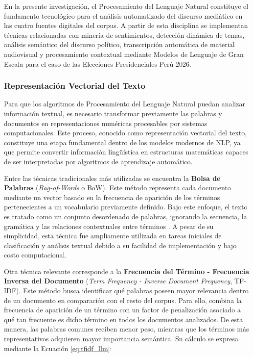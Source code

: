 En la presente investigación, el Procesamiento del Lenguaje Natural constituye el fundamento tecnológico para el análisis automatizado del discurso mediático en las cuatro fuentes digitales del corpus. A partir de esta disciplina se implementan técnicas relacionadas con minería de sentimientos, detección dinámica de temas, análisis semántico del discurso político, transcripción automática de material audiovisual y procesamiento contextual mediante Modelos de Lenguaje de Gran Escala para el caso de las Elecciones Presidenciales Perú 2026.

\subsubsection{Representación Vectorial del Texto}

Para que los algoritmos de Procesamiento del Lenguaje Natural puedan analizar información textual, es necesario transformar previamente las palabras y documentos en representaciones numéricas procesables por sistemas computacionales. Este proceso, conocido como representación vectorial del texto, constituye una etapa fundamental dentro de los modelos modernos de NLP, ya que permite convertir información lingüística en estructuras matemáticas capaces de ser interpretadas por algoritmos de aprendizaje automático.

Entre las técnicas tradicionales más utilizadas se encuentra la \textbf{Bolsa de Palabras} (\textit{Bag-of-Words} o BoW). Este método representa cada documento mediante un vector basado en la frecuencia de aparición de los términos pertenecientes a un vocabulario previamente definido. Bajo este enfoque, el texto es tratado como un conjunto desordenado de palabras, ignorando la secuencia, la gramática y las relaciones contextuales entre términos \parencite{bk_brownlee2017deeplearning_nlp}. A pesar de su simplicidad, esta técnica fue ampliamente utilizada en tareas iniciales de clasificación y análisis textual debido a su facilidad de implementación y bajo costo computacional.

Otra técnica relevante corresponde a la \textbf{Frecuencia del Término - Frecuencia Inversa del Documento} (\textit{Term Frequency - Inverse Document Frequency}, TF-IDF). Este método busca identificar qué palabras poseen mayor relevancia dentro de un documento en comparación con el resto del corpus. Para ello, combina la frecuencia de aparición de un término con un factor de penalización asociado a qué tan frecuente es dicho término en todos los documentos analizados. De esta manera, las palabras comunes reciben menor peso, mientras que los términos más representativos adquieren mayor importancia semántica. Su cálculo se expresa mediante la Ecuación \ref{eq:tfidf_llm}:

